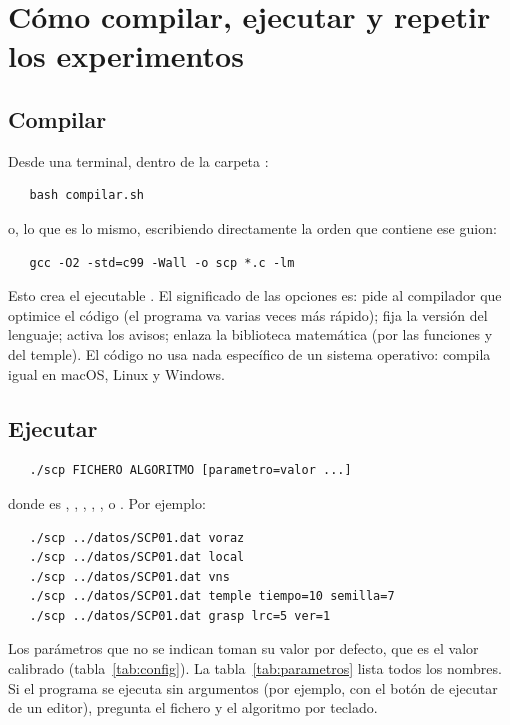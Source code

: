 \section{Cómo compilar, ejecutar y repetir los experimentos}\label{sec:uso}

\subsection{Compilar}

Desde una terminal, dentro de la carpeta :
\begin{verbatim}
   bash compilar.sh
\end{verbatim}
o, lo que es lo mismo, escribiendo directamente la orden que contiene ese guion:
\begin{verbatim}
   gcc -O2 -std=c99 -Wall -o scp *.c -lm
\end{verbatim}
Esto crea el ejecutable . El significado de las opciones es:  pide al
compilador que optimice el código (el programa va varias veces más rápido); 
fija la versión del lenguaje;  activa los avisos;  enlaza la biblioteca
matemática (por las funciones  y  del temple). El código no usa nada
específico de un sistema operativo: compila igual en macOS, Linux y Windows.

\subsection{Ejecutar}

\begin{verbatim}
   ./scp FICHERO ALGORITMO [parametro=valor ...]
\end{verbatim}
donde  es , , , , ,
 o . Por ejemplo:
\begin{verbatim}
   ./scp ../datos/SCP01.dat voraz
   ./scp ../datos/SCP01.dat local
   ./scp ../datos/SCP01.dat vns
   ./scp ../datos/SCP01.dat temple tiempo=10 semilla=7
   ./scp ../datos/SCP01.dat grasp lrc=5 ver=1
\end{verbatim}
Los parámetros que no se indican toman su valor por defecto, que es el valor calibrado
(tabla~\ref{tab:config}). La tabla~\ref{tab:parametros} lista todos los nombres. Si el
programa se ejecuta sin argumentos (por ejemplo, con el botón de ejecutar de un editor),
pregunta el fichero y el algoritmo por teclado.

